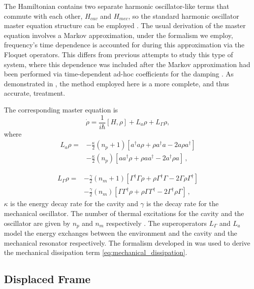 \documentclass[reprint, amsmath,amssymb, aps,pra]{revtex4-1}
\begin{document}
The Hamiltonian contains two separate harmonic oscillator-like terms
that commute with each other, $H_{cav}$ and $H_{mec}$, so the standard
harmonic oscillator master equation structure can be employed
\cite{TesisMaestria}\cite{HanngiFM}. The usual derivation of the master
equation involves a Markov approximation, under the formalism we
employ, frequency's time dependence is accounted for during this
approximation \cite{HanngiFM} via the Floquet operators. This differs
from previous attempts to study this type of system, where this
dependence was included after the Markov approximation had been
performed via time-dependent ad-hoc coefficients for the damping
\cite{BarberisLC}. As demonstrated in \cite{HanngiFM}, the method
employed here is a more complete, and thus accurate, treatment.

The corresponding master equation is
\begin{equation} \label{LCMasterEquation}
\dot{\rho} = \frac{1}{i\hbar}[H,\rho] +L_a\rho + L_\Gamma \rho,
\end{equation}
where
\begin{align}
L_a \rho =& - \frac{\kappa}{2}(n_p + 1)[a^\dagger a\rho + \rho a^\dagger a -2a\rho a^\dagger]  \\
 &- \frac{\kappa}{2}(n_p)[ aa^\dagger\rho + \rho  aa^\dagger -2a^\dagger\rho a]\, ,\nonumber
\end{align}

\begin{align}\label{eq:mechanical_dissipation}
  L_\Gamma \rho =& - \frac{\gamma}{2}(n_m + 1)[\Gamma^\dagger \Gamma\rho + \rho \Gamma^\dagger \Gamma -2\Gamma\rho \Gamma^\dagger]  \\
                 &- \frac{\gamma}{2}(n_m)[ \Gamma\Gamma^\dagger\rho + \rho  \Gamma\Gamma^\dagger -2\Gamma^\dagger\rho \Gamma]\, ,\nonumber
\end{align} 
$\kappa$ is the energy decay rate for the cavity and $\gamma$ is the
decay rate for the mechanical oscillator. The number of thermal
excitations for the cavity and the oscillator are given by $n_p$ and
$n_m$ respectively \cite{EnglertFL}. The superoperators $L_\Gamma$ and $L_a$ model the energy
exchanges between the environment and the cavity and the mechanical
resonator respectively. The formalism developed in \cite{HanngiFM} was
used to derive the mechanical dissipation term \eqref{eq:mechanical_dissipation}.



\subsection{Displaced Frame}
\end{document}
